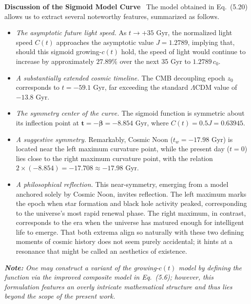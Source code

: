 \documentclass[12pt,leqno]{article}
\begin{document}
	
	\medskip
	\bigskip
	{\bf Discussion of the Sigmoid Model Curve}\,\,\,
	The model obtained in Eq.~(5.20) allows us to extract several noteworthy features, summarized as follows.
	\begin{itemize}
		\item \textit{The asymptotic future light speed.} As \( t \to +35 \) Gyr, the normalized light speed \( C(t) \) approaches the asymptotic value \( J = 1.2789 \), implying that, should this sigmoid growing-$c(t)$ hold, the speed of light would continue to increase by approximately \( 27.89\% \) over the next 35 Gyr to \( 1.2789\,c_0\).
		
		\item \textit{A substantially extended cosmic timeline.} The CMB decoupling epoch \( z_0 \) corresponds to \( t = -59.1 \) Gyr, far exceeding the standard \(\Lambda\)CDM value of \( -13.8 \) Gyr.
		
		\item \textit{The symmetry center of the curve.} The sigmoid function is symmetric about its inflection point at \( \boldsymbol{t} = \boldsymbol{-\beta} = -8.854 \) Gyr, where \( C(t) = 0.5J = 0.63945 \).
				
		\item \textit{A suggestive symmetry.} Remarkably, Cosmic Noon (\( t_w = -17.98 \) Gyr) is located near the left maximum curvature point, while the present day (\( t = 0 \)) lies close to the right maximum curvature point, with the relation \( 2\times(-8.854) = -17.708 \approx -17.98\) Gyr.
		
		\item \textit{A philosophical reflection.} This near-symmetry, emerging from a model anchored solely by Cosmic Noon, invites reflection. The left maximum marks the epoch when star formation and black hole activity peaked, corresponding to the universe's most rapid renewal phase. The right maximum, in contrast, corresponds to the era when the universe has matured enough for intelligent life to emerge. That both extrema align so naturally with these two defining moments of cosmic history does not seem purely accidental; it hints at a resonance that might be called an aesthetics of existence.
	\end{itemize}

		
	\medskip
	\textit{\textbf{Note:} One may construct a variant of the growing-$c(t)$ model by defining the function via the improved composite model in Eq.~(5.6); however, this formulation features an overly intricate mathematical structure and thus lies beyond the scope of the present work.}
	
\end{document}
